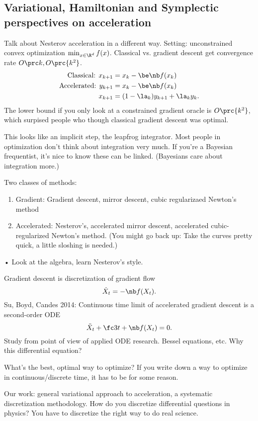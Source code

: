 \subsection{Variational, Hamiltonian and Symplectic perspectives on acceleration}

Talk about Nesterov acceleration in a different way. Setting: unconstrained convex optimization $\min_{x\in \R^d}f(x)$. Classical vs. gradient descent get convergence rate $O\prc k, O\prc{k^2}$.
\begin{align}
\text{Classical: }x_{k+1}&=x_k - \be \nb f(x_k)\\
\text{Accelerated: }y_{k+1} &=x_k-\be \nb f(x_k)\\
x_{k+1} &=(1-\la_k) y_{k+1} + \la_ky_k.
\end{align}
The lower bound if you only look at a constrained gradient oracle is $O\prc{k^2}$, which surpised people who though classical gradient descent was optimal.

This looks like an implicit step, the leapfrog integrator. Most people in optimization don't think about integration very much. If you're a Bayesian frequentist, it's nice to know these can be linked. (Bayesians care about integration more.)

Two classes of methods:
\begin{enumerate}
\item
Gradient: 
Gradient descent, mirror descent, cubic regularizaed Newton's method
\item
Accelerated: 
Nesterov's, accelerated mirror descent, accelerated cubic-regularized Newton's method. 
(You might go back up: Take the curves pretty quick, a little sloshing is needed.)
\end{enumerate}•
Look at the algebra, learn Nesterov's style.

Gradient descent is discretization of gradient flow
$$
\dot X_t = -\nb f(X_t).
$$
Su, Boyd, Candes 2014: Continuous time limit of accelerated gradient descent is a second-order ODE
$$
\ddot X_t + \fc 3t + \nb f(X_t)=0.
$$
Study from point of view of applied ODE research. Bessel equations, etc. Why this differential equation? 

What's the best, optimal way to optimize? If you write down a way to optimize in continuous/discrete time, it has to be for some reason.

Our work: general variational approach to acceleration, a systematic discretization methodology. How do you discretize differential questions in physics? You have to discretize the right way to do real science.

